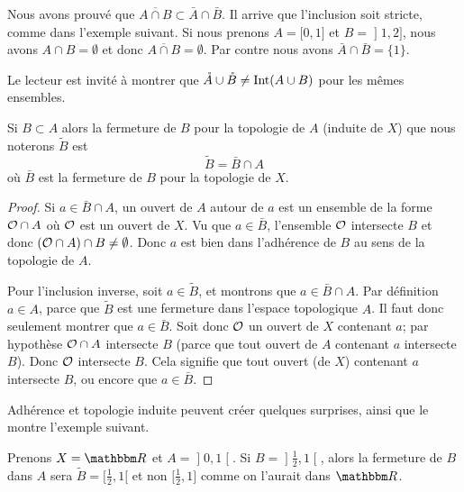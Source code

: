 \begin{remark} \label{ExBFLooUNyvbw}
	Nous avons prouvé que $\overline{ A\cap B }\subset\bar A\cap\bar B$. Il arrive que l'inclusion soit stricte, comme dans l'exemple suivant. Si nous prenons $A=\mathopen[ 0 , 1 \mathclose]$ et $B=\mathopen] 1 , 2 \mathclose]$, nous avons $A\cap B=\emptyset$ et donc $\overline{ A\cap B }=\emptyset$. Par contre nous avons $\bar A\cap\bar B=\{ 1 \}$.

        Le lecteur est invité à montrer que \( \mathring A \cup \mathring B \neq \operatorname{Int}(A \cup B) \) pour les mêmes ensembles.
\end{remark}


\begin{lemma}       \label{LemkUYkQt}
    Si \( B\subset A\) alors la fermeture de \( B\) pour la topologie de \( A\) (induite de \( X\)) que nous noterons \( \tilde B\) est
    \begin{equation}
        \tilde B=\bar B\cap A
    \end{equation}
    où \( \bar B\) est la fermeture de \( B\) pour la topologie de \( X\).
\end{lemma}

\begin{proof}
    Si \( a\in \bar B\cap A\), un ouvert de \( A\) autour de \( a\) est un ensemble de la forme \( \mathcal{O}\cap A\) où \( \mathcal{O}\) est un ouvert de \( X\). Vu que \( a\in\bar B\), l'ensemble \( \mathcal{O}\) intersecte \( B\) et donc \( (\mathcal{O}\cap A)\cap B\neq \emptyset\). Donc \( a\) est bien dans l'adhérence de \( B\) au sens de la topologie de \( A\).

    Pour l'inclusion inverse, soit \( a\in \tilde  B\), et montrons que \( a\in \bar B\cap A\). Par définition \( a\in A\), parce que \( \tilde B\) est une fermeture dans l'espace topologique \( A\). Il faut donc seulement montrer que \( a\in\bar B\). Soit donc \( \mathcal{O}\) un ouvert de \( X\) contenant \( a\); par hypothèse \( \mathcal{O}\cap A\) intersecte \( B\) (parce que tout ouvert de \( A\) contenant \( a\) intersecte \( B\)). Donc \( \mathcal{O}\) intersecte \( B\). Cela signifie que tout ouvert (de \( X\)) contenant \( a\) intersecte \( B\), ou encore que \( a\in \bar B\).
\end{proof}

Adhérence et topologie induite peuvent créer quelques surprises, ainsi que le montre l'exemple suivant.

\begin{example} \label{ExloeyoR}
Prenons \( X=\eR\) et \( A=\mathopen] 0 , 1 \mathclose[\). Si \( B=\mathopen] \frac{ 1 }{2} , 1 \mathclose[ \), alors la fermeture de \( B\) dans \( A\) sera \( \tilde B=\mathopen[ \frac{ 1 }{2} , 1 [\) et non \( \mathopen[ \frac{ 1 }{2} , 1 \mathclose]\) comme on l'aurait dans \( \eR\).
\end{example}

